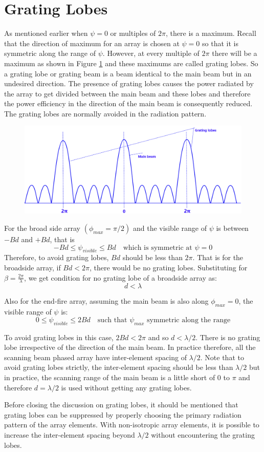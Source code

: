 \section{Grating Lobes}
As mentioned earlier when $\psi = 0 $ or multiples of $2\pi$, there is a maximum. Recall that the direction of maximum for an array is chosen at $\psi = 0$ so that it is symmetric along the range of $\psi$. However, at every multiple of $2\pi$ there will be a maximum as shown in Figure \ref{54.9} and these maximums are called grating lobes. So a grating lobe or grating beam is a beam identical to the main beam but in an undesired direction. The presence of grating lobes causes the power radiated by the array to get divided between the main beam and these lobes and therefore the power efficiency in the direction of the main beam is consequently reduced. The grating lobes are normally avoided in the radiation pattern.
\begin{figure}[h]
\includegraphics[width=1\linewidth]{./graphics/fig54_6}
\centering
\caption{}
\label{54.9}
\end{figure}

For the broad side array $(\phi_{max} = \pi/2)$ and the visible range of $\psi$ is between $-Bd$ and $+Bd$, that is
$$
-Bd \leq \psi_{visible} \leq Bd \quad \text{which is symmetric at $\psi =0$}
$$
Therefore, to avoid grating lobes, $Bd$ should be less than $2\pi$. That is for the broadside array, if $Bd < 2\pi$, there would be no grating lobes. Substituting for $\beta = \frac{2\pi}{\lambda}$, we get condition for no grating lobe of a broadside array as:
$$d < \lambda $$

Also for the end-fire array, assuming the main beam is also along $\phi_{max} = 0$, the visible range of $\psi$ is:
$$
0 \leq \psi_{visible} \leq 2Bd \quad \text{such that $\psi_{max}$ symmetric along the range}
$$

To avoid grating lobes in this case, $2Bd < 2 \pi$ and so $d < \lambda/2$. There is no grating lobe irrespective of the direction of the main beam. In practice therefore, all the scanning beam phased array have inter-element spacing of $\lambda /2$. Note that to avoid grating lobes strictly, the inter-element spacing should be less than $\lambda / 2$ but in practice, the scanning range of the main beam is a little short of $0$ to $\pi$ and therefore $d=\lambda/2$ is used without getting any grating lobes.

Before closing the discussion on grating lobes, it should be mentioned that grating lobes can be suppressed by properly choosing the primary radiation pattern of the array elements. With  non-isotropic array elements, it is possible to increase the inter-element spacing beyond $\lambda/2$ without encountering the grating lobes.